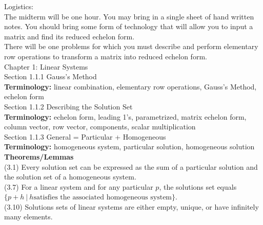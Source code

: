 \documentclass[11pt,fleqn]{article}
\begin{document}
\renewcommand{\headrulewidth}{0pt}
\newcommand{\blank}[1]{\rule{#1}{0.75pt}}
\renewcommand{\d}{\displaystyle}

\vspace*{-0.7in}

\begin{center}
  \large {}
\end{center}

\noindent Logistics:\\
The midterm will be one hour. You may bring in a single sheet of hand written notes. You should bring some form of technology that will allow you to input a matrix and find its reduced echelon form.\\
There will be one problems for which you must describe and perform elementary row operations to transform a matrix into reduced echelon form.\\

\noindent Chapter 1: Linear Systems\\

\noindent Section 1.1.1 Gauss's Method\\

\textbf{Terminology:}  linear combination, elementary row operations, Gauss's Method, echelon form\\

\noindent Section 1.1.2 Describing the Solution Set\\

\textbf{Terminology:} echelon form, leading 1's, parametrized, matrix echelon form, column vector, row vector, components, scalar multiplication\\

\noindent Section 1.1.3 General = Particular + Homogeneous\\

\textbf{Terminology:} homogeneous system, particular solution, homogeneous solution\\

\textbf{Theorems/Lemmas} \\
(3.1) Every solution set can be expressed as the sum of a particular solution and the solution set of a homogeneous system.\\
(3.7) For a linear system and for any particular $p$, the solutions set equals $\{p+h \: | \: h  \text{satisfies the associated homogeneous system}\}$.\\
(3.10) Solutions sets of linear systems are either empty, unique, or have infinitely many elements.\\
\end{document}
